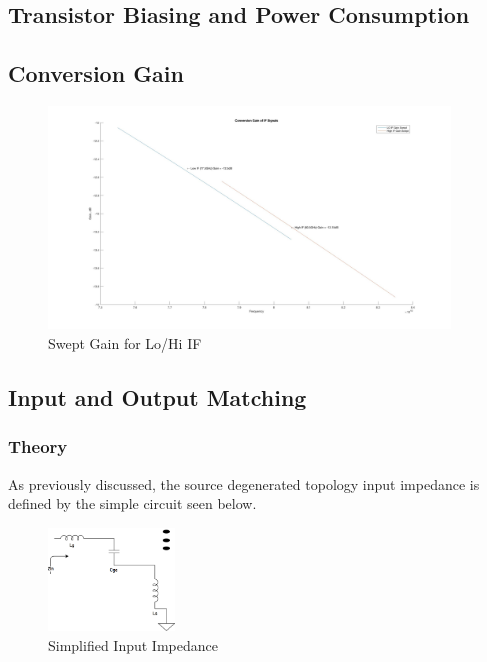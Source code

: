 \documentclass{article}                                                         %
\begin{document}
\subsection{Transistor Biasing and Power Consumption}

\subsection{Conversion Gain}
\begin{figure}[H]
  \centering
  \includegraphics[width=0.95\textwidth] {Plots/Gain.jpg}
  \caption{Swept Gain for Lo/Hi IF}
    \label{fig:matgain}
\end{figure}
\subsection{Input and Output Matching}
\subsubsection{Theory}
As previously discussed, the source degenerated topology input impedance is defined by the
simple circuit seen below.

\begin{figure}[H]
  \centering
  \includegraphics[width=0.3\textwidth] {Figures/zin}
  \caption{Simplified Input Impedance}
    \label{fig:zinSimple}
\end{figure}
\end{document}
